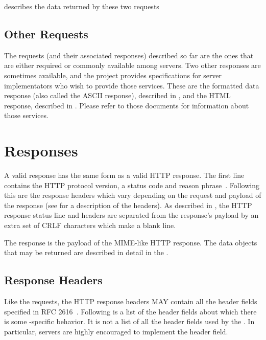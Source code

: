 \documentclass[justify]{dods-paper}
\begin{document}
 describes the data returned by these
two requests

\subsection{Other Requests}

The requests (and their associated responses) described so far are the
ones that are either required or commonly available among \DAP
servers.  Two other responses are sometimes available, and the
\opendap project provides specifications for server implementators who
wish to provide those services.  These are the formatted data response
(also called the ASCII response), described in \DAPASCII, and the HTML
response, described in \DAPHTML.  Please refer to those documents for
information about those services.

\section{Responses}
\label{sec-responses}

A valid \DAP response has the same form as a valid HTTP response.  The
first line contains the HTTP protocol version, a status code and
reason phrase~\cite{rfc2616}. Following this are the response headers
which vary depending on the request and payload of the response (see
 for a description of the headers). As
described in \cite{rfc822}, the HTTP response status line and headers
are separated from the response's payload by an extra set of CRLF
characters which make a blank line.

The \DAP response is the payload of the MIME-like HTTP response.  The
data objects that may be returned are described in detail in the
\DAPObjects.


\subsection{Response Headers}
\label{sec-resp-headers}

Like the requests, the HTTP response headers MAY contain all the
header fields specified in RFC 2616~\cite{rfc2616}.  Following is a
list of the header fields about which there is some \DAP{}-specific
behavior.  It is not a list of all the header fields used by the
\DAP.  In particular, servers are highly encouraged to implement the
 header field.
\end{document}

